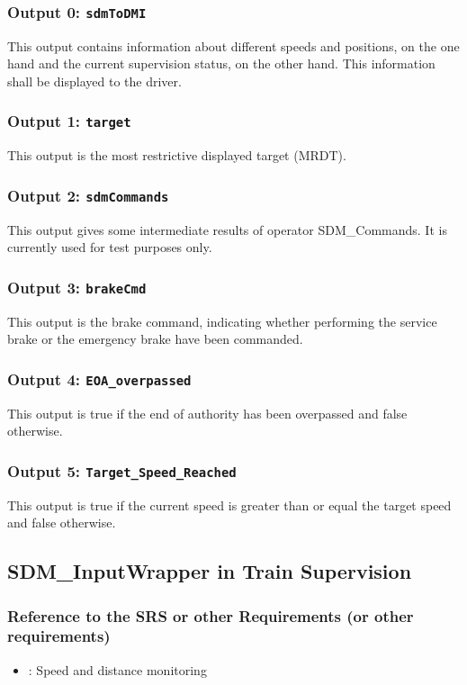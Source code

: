 \subsubsection{Output 0: \texttt{sdmToDMI}}
This output contains information about different speeds and positions, on the one hand and the current supervision status, on the other hand. This information shall be displayed to the driver.
\subsubsection{Output 1: \texttt{target}}
This output is the most restrictive displayed target (MRDT).
\subsubsection{Output 2: \texttt{sdmCommands}}
This output gives some intermediate results of operator SDM\_Commands. It is currently used for test purposes only.
\subsubsection{Output 3: \texttt{brakeCmd}}
This output is the brake command, indicating whether performing the service brake or the emergency brake have been commanded.
\subsubsection{Output 4: \texttt{EOA\_overpassed}}
This output is true if the end of authority has been overpassed and false otherwise.
\subsubsection{Output 5: \texttt{Target\_Speed\_Reached}}
This output is true if the current speed is greater than or equal the target speed and false otherwise.



\subsection{SDM\_InputWrapper in Train Supervision}

\subsubsection{Reference to the SRS or other Requirements (or other requirements)}
\begin{itemize}
	\item \cite[Chapt.~3.13]{subset-026}: Speed and distance monitoring 
\end{itemize}

